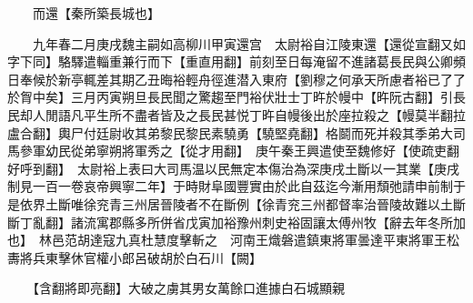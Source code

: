 　　而還【秦所築長城也】

　　九年春二月庚戌魏主嗣如高柳川甲寅還宫　太尉裕自江陵東還【還從宣翻又如字下同】駱驛遣輜重兼行而下【重直用翻】前刻至日每淹留不進諸葛長民與公卿頻日奉候於新亭輒差其期乙丑晦裕輕舟徑進潜入東府【劉穆之何承天所慮者裕已了了於胷中矣】三月丙寅朔旦長民聞之驚趨至門裕伏壯士丁旿於幔中【旿阮古翻】引長民却人閒語凡平生所不盡者皆及之長民甚悦丁旿自幔後出於座拉殺之【幔莫半翻拉盧合翻】輿尸付廷尉收其弟黎民黎民素驍勇【驍堅堯翻】格鬬而死并殺其季弟大司馬參軍幼民從弟寧朔將軍秀之【從才用翻】　庚午秦王興遣使至魏修好【使疏吏翻好呼到翻】　太尉裕上表曰大司馬温以民無定本傷治為深庚戌土斷以一其業【庚戌制見一百一卷哀帝興寧二年】于時財阜國豐實由於此自茲迄今漸用頹弛請申前制于是依界土斷唯徐兖青三州居晉陵者不在斷例【徐青兖三州都督率治晉陵故難以土斷斷丁亂翻】諸流寓郡縣多所併省戊寅加裕豫州刺史裕固讓太傅州牧【辭去年冬所加也】　林邑范胡達寇九真杜慧度擊斬之　河南王熾磐遣鎮東將軍曇達平東將軍王松夀將兵東擊休官權小郎呂破胡於白石川【闕】

　　【含翻將即亮翻】大破之虜其男女萬餘口進據白石城顯親

